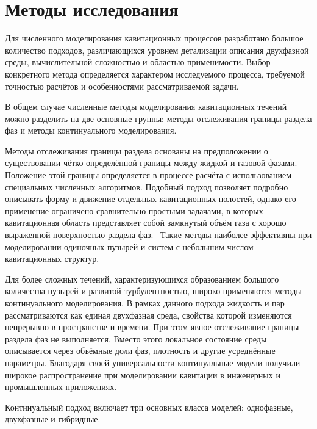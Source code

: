 \newpage
\section{Методы исследования}
\vspace{0.5\baselineskip}

Для численного моделирования кавитационных процессов разработано большое количество подходов, различающихся уровнем детализации описания двухфазной среды, вычислительной сложностью и областью применимости. Выбор конкретного метода определяется характером исследуемого процесса, требуемой точностью расчётов и особенностями рассматриваемой задачи.

В общем случае численные методы моделирования кавитационных течений можно разделить на две основные группы: методы отслеживания границы раздела фаз и методы континуального моделирования. ~\cite{10.1016/s1001-6058(11)60389-3}

Методы отслеживания границы раздела основаны на предположении о существовании чётко определённой границы между жидкой и газовой фазами. Положение этой границы определяется в процессе расчёта с использованием специальных численных алгоритмов. Подобный подход позволяет подробно описывать форму и движение отдельных кавитационных полостей, однако его применение ограничено сравнительно простыми задачами, в которых кавитационная область представляет собой замкнутый объём газа с хорошо выраженной поверхностью раздела фаз.~\cite{10.1016/s0021-9991(03)00087-1, 10.1063/1.868709} Такие методы наиболее эффективны при моделировании одиночных пузырей и систем с небольшим числом кавитационных структур.

Для более сложных течений, характеризующихся образованием большого количества пузырей и развитой турбулентностью, широко применяются методы континуального моделирования. В рамках данного подхода жидкость и пар рассматриваются как единая двухфазная среда, свойства которой изменяются непрерывно в пространстве и времени. При этом явное отслеживание границы раздела фаз не выполняется. Вместо этого локальное состояние среды описывается через объёмные доли фаз, плотность и другие усреднённые параметры. Благодаря своей универсальности континуальные модели получили широкое распространение при моделировании кавитации в инженерных и промышленных приложениях.~\cite{10.1016/j.compfluid.2009.03.001}

Континуальный подход включает три основных класса моделей: однофазные, двухфазные и гибридные.

